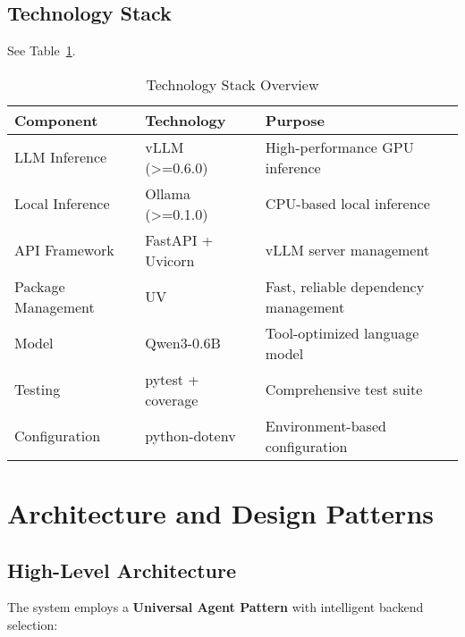 \documentclass{article}
\begin{document}
\subsection{Technology Stack}
See Table~\ref{table:tech-stack}.

\begin{table}[ht]
\centering
\begin{tabular}{|l|l|l|}
\hline
\textbf{Component} & \textbf{Technology} & \textbf{Purpose} \\
\hline
LLM Inference & vLLM (>=0.6.0) & High-performance GPU inference \\
Local Inference & Ollama (>=0.1.0) & CPU-based local inference \\
API Framework & FastAPI + Uvicorn & vLLM server management \\
Package Management & UV & Fast, reliable dependency management \\
Model & Qwen3-0.6B & Tool-optimized language model \\
Testing & pytest + coverage & Comprehensive test suite \\
Configuration & python-dotenv & Environment-based configuration \\
\hline
\end{tabular}
\caption{Technology Stack Overview}
\label{table:tech-stack}
\end{table}

\section{Architecture and Design Patterns}

\subsection{High-Level Architecture}

The system employs a \textbf{Universal Agent Pattern} with intelligent backend selection:

\begin{center}
\end{center}
\end{document}
